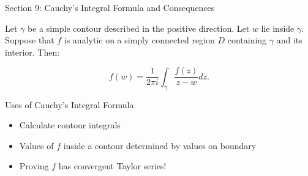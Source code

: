 \documentclass{beamer}
\begin{document}
\begin{frame}{Section 9: Cauchy's Integral Formula and Consequences}
\begin{theorem} Let $\gamma$ be a simple contour described in the positive direction.  Let $w$ lie inside $\gamma$.  Suppose that $f$ is analytic on a simply connected region $D$ containing $\gamma$ and its interior.  Then:

$$f(w)=\frac{1}{2\pi i} \int_\gamma\frac{f(z)}{z-w}dz.$$

\end{theorem}
\begin{block}{Uses of Cauchy's Integral Formula}
\begin{itemize}
    \item Calculate contour integrals
    \item Values of $f$ inside a contour determined by values on boundary
    \item \alert{Proving $f$ has convergent Taylor series!}
\end{itemize}
\end{block}

\end{frame}
\end{document}
